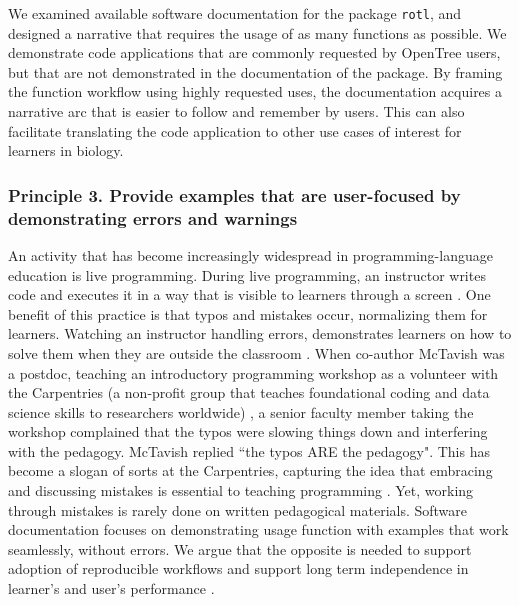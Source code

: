 \documentclass[12pt]{article}
\begin{document}
We examined available software documentation for the package \texttt{rotl}, and designed a narrative that requires the usage of as many functions as possible.
We demonstrate code applications that are commonly requested by OpenTree users, but that are not demonstrated in the documentation of the package.
By framing the function workflow using highly requested uses, the documentation acquires a narrative arc that is easier to follow and remember by users.
This can also facilitate translating the code application to other use cases of interest for learners in biology.


\subsubsection*{Principle 3. Provide examples that are user-focused by demonstrating errors and warnings}


An activity that has become increasingly widespread in programming-language education is live programming.
During live programming, an instructor writes code and executes it in a way that is visible to learners through a screen \citep{guzdial2013lure, selvaraj2021live}.
One benefit of this practice is that typos and mistakes occur, normalizing them for learners.
Watching an instructor handling errors, demonstrates learners on how to solve them when they are outside the classroom \citep{shannon2015live, nederbragt2020ten}.
When co-author McTavish was a postdoc, teaching an introductory programming workshop as a volunteer with the Carpentries (a non-profit group that teaches foundational coding and data science skills to researchers worldwide) \citep{wilson2006swc, SWCwebsite},
a senior faculty member taking the workshop complained that the typos were slowing things down and interfering with the pedagogy.
McTavish replied ``the typos ARE the pedagogy".
This has become a slogan of sorts at the Carpentries, capturing the idea that embracing and discussing mistakes is essential to teaching programming \citep{wilson2019teaching}.
Yet, working through mistakes is rarely done on written pedagogical materials.
Software documentation focuses on demonstrating usage function with examples that work seamlessly, without errors.
We argue that the opposite is needed to support adoption of reproducible workflows and support long term independence in learner's and user's performance \citep{gaspar2007restoring, steele2014error}.
\end{document}
